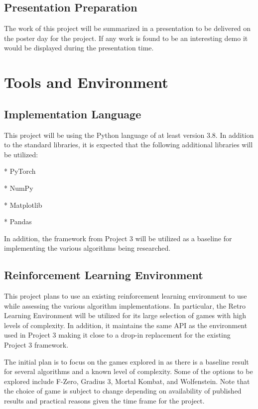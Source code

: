 \documentclass[conference]{IEEEtran}
\begin{document}
\subsection{Presentation Preparation}
The work of this project will be summarized in a presentation to be delivered on the poster day for the project.
If any work is found to be an interesting demo it would be displayed during the presentation time.

\section{Tools and Environment}

\subsection{Implementation Language}
This project will be using the Python language of at least version 3.8.
In addition to the standard libraries, it is expected that the following additional libraries will be utilized:

* PyTorch

* NumPy

* Matplotlib

* Pandas

In addition, the framework from Project 3 will be utilized as a baseline for implementing the various algorithms being researched.

\subsection{Reinforcement Learning Environment}
This project plans to use an existing reinforcement learning environment to use while assessing the various algorithm implementations.
In particular, the Retro Learning Environment \cite{bhonker2017playing} will be utilized for its large selection of games with high levels of complexity.
In addition, it maintains the same API as the environment used in Project 3 making it close to a drop-in replacement for the existing Project 3 framework.

The initial plan is to focus on the games explored in \cite{bhonker2017playing} as there is a baseline result for several algorithms and a known level of complexity.
Some of the options to be explored include F-Zero, Gradius 3, Mortal Kombat, and Wolfenstein.
Note that the choice of game is subject to change depending on availability of published results and practical reasons given the time frame for the project.
\end{document}
